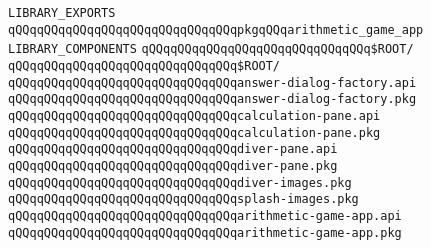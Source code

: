 \label{src/lib/x-kit/tut/arithmetic-game/arithmetic-game-app.lib}
\verb|LIBRARY_EXPORTS|\newline
\newline
\verb|qQQqqQQqqQQqqQQqqQQqqQQqqQQqqQQqpkgqQQqarithmetic_game_app|\newline
\newline
\verb|LIBRARY_COMPONENTS|\newline
\newline
\verb|qQQqqQQqqQQqqQQqqQQqqQQqqQQqqQQq$ROOT/|\newline
\verb|qQQqqQQqqQQqqQQqqQQqqQQqqQQqqQQq$ROOT/|\newline
\newline
\verb|qQQqqQQqqQQqqQQqqQQqqQQqqQQqqQQqanswer-dialog-factory.api|\newline
\verb|qQQqqQQqqQQqqQQqqQQqqQQqqQQqqQQqanswer-dialog-factory.pkg|\newline
\newline
\verb|qQQqqQQqqQQqqQQqqQQqqQQqqQQqqQQqcalculation-pane.api|\newline
\verb|qQQqqQQqqQQqqQQqqQQqqQQqqQQqqQQqcalculation-pane.pkg|\newline
\newline
\verb|qQQqqQQqqQQqqQQqqQQqqQQqqQQqqQQqdiver-pane.api|\newline
\verb|qQQqqQQqqQQqqQQqqQQqqQQqqQQqqQQqdiver-pane.pkg|\newline
\newline
\verb|qQQqqQQqqQQqqQQqqQQqqQQqqQQqqQQqdiver-images.pkg|\newline
\verb|qQQqqQQqqQQqqQQqqQQqqQQqqQQqqQQqsplash-images.pkg|\newline
\newline
\verb|qQQqqQQqqQQqqQQqqQQqqQQqqQQqqQQqarithmetic-game-app.api|\newline
\verb|qQQqqQQqqQQqqQQqqQQqqQQqqQQqqQQqarithmetic-game-app.pkg|\newline
\newline

